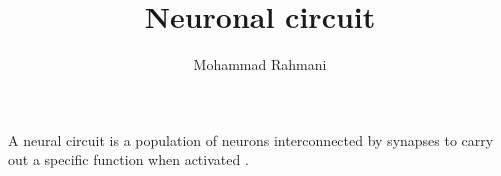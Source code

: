 \documentclass[a4paper]{article}
\title{Neuronal circuit}
\date{}
\author{Mohammad Rahmani}
\begin{document}
\maketitle
    A neural circuit is a population of neurons interconnected by synapses to carry out a specific function when activated .
\end{document}
